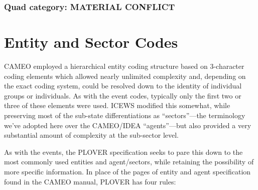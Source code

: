 \documentclass[11pt]{report}
\begin{document}
 
\subsection{Quad category: MATERIAL CONFLICT}



\chapter{Entity and Sector Codes}

CAMEO employed a hierarchical entity coding structure based on 3-character coding elements which allowed nearly unlimited complexity and, depending on the exact coding system, could be resolved down to the identity of individual groups or individuals. As with the event codes, typically only the first two or three of these elements were used. ICEWS modified this somewhat, while preserving most of the sub-state differentiations as ``sectors''---the terminology we've adopted here over the CAMEO/IDEA ``agents''---but also provided a very substantial amount of complexity at the sub-sector level.

As with the events, the PLOVER specification seeks to pare this down to the most commonly used entities and agent/sectors, while retaining the possibility of more specific information. In place of the pages of entity and agent specification found in the CAMEO manual, PLOVER has four rules:
\end{document}
